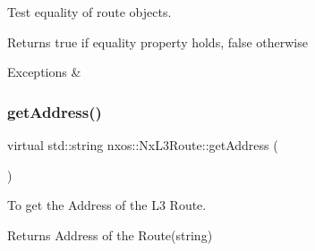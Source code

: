Test equality of route objects.

\begin{DoxyReturn}{Returns}
true if equality property holds, false otherwise
\end{DoxyReturn}

\begin{DoxyCode}
\end{DoxyCode}



\begin{DoxyExceptions}{Exceptions}
{\em } & \\
\hline
\end{DoxyExceptions}
\mbox{\label{classnxos_1_1_nx_l3_route_a3176245539589bf745ce1d196975b3c9}} 
\subsubsection{\texorpdfstring{get\+Address()}{getAddress()}}
{\footnotesize\ttfamily virtual std\+::string nxos\+::\+Nx\+L3\+Route\+::get\+Address (\begin{DoxyParamCaption}{ }\end{DoxyParamCaption})\hspace{0.3cm}{\ttfamily [pure virtual]}}

To get the Address of the L3 Route.

\begin{DoxyReturn}{Returns}
Address of the Route(string)
\end{DoxyReturn}

